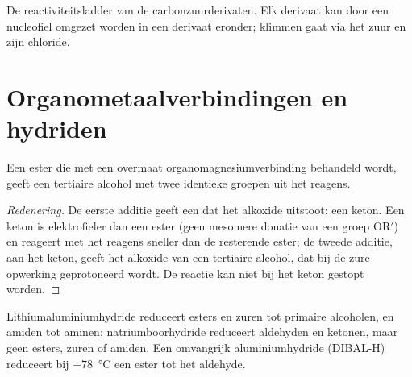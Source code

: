 \begin{omfigure}

{\small De reactiviteitsladder van de carbonzuurderivaten. Elk derivaat kan door een nucleofiel omgezet worden in
een derivaat eronder; klimmen gaat via het zuur en zijn chloride.}
\end{omfigure}

\section{Organometaalverbindingen en hydriden}

\begin{proposition}\label{prop:b2:acyl-substitution:grignard-ester}
Een ester die met een overmaat organomagnesiumverbinding behandeld wordt, geeft een tertiaire alcohol met twee
identieke groepen uit het reagens.
\end{proposition}

\begin{proof}[Redenering]
De eerste additie geeft een  dat het alkoxide uitstoot: een keton. Een keton
is elektrofieler dan een ester (geen mesomere donatie van een groep $\mathrm{OR'}$) en reageert met
het reagens sneller dan de resterende ester; de tweede additie, aan het keton, geeft het alkoxide
van een tertiaire alcohol, dat bij de zure opwerking geprotoneerd wordt. De reactie kan niet bij het keton gestopt worden.
\end{proof}

\begin{proposition}\label{prop:b2:acyl-substitution:hydrides}
Lithiumaluminiumhydride reduceert esters en zuren tot primaire alcoholen, en amiden tot aminen;
natriumboorhydride reduceert aldehyden en ketonen, maar geen esters, zuren of amiden. Een omvangrijk aluminiumhydride
(DIBAL-H) reduceert bij \qty{-78}{\degreeCelsius} een ester tot het aldehyde.
\end{proposition}

